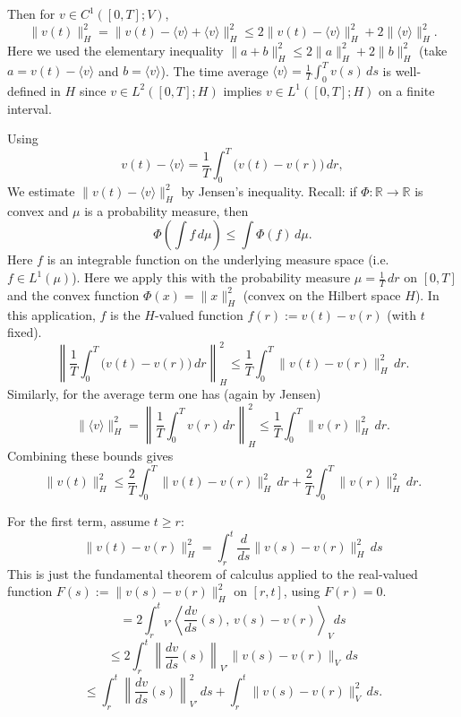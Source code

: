 \documentclass[11pt]{article}
\theoremstyle{definition}
\theoremstyle{remark}
\begin{document}
Then for $v\in C^1([0,T];V)$,
\[
\|v(t)\|_H^2
=
\|v(t)-\langle v\rangle+\langle v\rangle\|_H^2
\le
2\|v(t)-\langle v\rangle\|_H^2
+2\|\langle v\rangle\|_H^2.
\]
\noindent
Here we used the elementary inequality $\|a+b\|_H^2\le 2\|a\|_H^2+2\|b\|_H^2$ (take $a=v(t)-\langle v\rangle$ and $b=\langle v\rangle$). The time average $\langle v\rangle=\frac1T\int_0^T v(s)\,ds$ is well-defined in $H$ since $v\in L^2([0,T];H)$ implies $v\in L^1([0,T];H)$ on a finite interval.

Using
\[
v(t)-\langle v\rangle
=
\frac{1}{T}\int_0^T\bigl(v(t)-v(r)\bigr)\,dr,
\]
\noindent
We estimate $\|v(t)-\langle v\rangle\|_H^2$ by Jensen's inequality. Recall: if $\Phi:\mathbb{R}\to\mathbb{R}$ is convex and $\mu$ is a probability measure, then
\[
\Phi\!\left(\int f\,d\mu\right)\le \int \Phi(f)\,d\mu.
\]
\noindent
Here $f$ is an integrable function on the underlying measure space (i.e.\ $f\in L^1(\mu)$).
Here we apply this with the probability measure $\mu=\frac{1}{T}\,dr$ on $[0,T]$ and the convex function $\Phi(x)=\|x\|_H^2$ (convex on the Hilbert space $H$).
\noindent
In this application, $f$ is the $H$-valued function $f(r):=v(t)-v(r)$ (with $t$ fixed).
\[
\left\| \frac{1}{T}\int_0^T \bigl(v(t)-v(r)\bigr)\,dr \right\|_H^2
\le
\frac{1}{T}\int_0^T \|v(t)-v(r)\|_H^2\,dr.
\]
Similarly, for the average term one has (again by Jensen)
\[
\|\langle v\rangle\|_H^2
=
\left\|\frac{1}{T}\int_0^T v(r)\,dr\right\|_H^2
\le
\frac{1}{T}\int_0^T \|v(r)\|_H^2\,dr.
\]
Combining these bounds gives
\[
\|v(t)\|_H^2
\le
\frac{2}{T}\int_0^T \|v(t)-v(r)\|_H^2\,dr
+
\frac{2}{T}\int_0^T \|v(r)\|_H^2\,dr.
\]

For the first term, assume $t\ge r$:
\[
\|v(t)-v(r)\|_H^2
=
\int_r^t \frac{d}{ds}\|v(s)-v(r)\|_H^2\,ds
\]
\noindent
This is just the fundamental theorem of calculus applied to the real-valued function $F(s):=\|v(s)-v(r)\|_H^2$ on $[r,t]$, using $F(r)=0$.
\[
=
2\int_r^t
{}_{V'}\left\langle \frac{dv}{ds}(s),\,v(s)-v(r)\right\rangle_{V} ds
\]
\[
\le
2\int_r^t
\left\|\frac{dv}{ds}(s)\right\|_{V'}
\|v(s)-v(r)\|_V\,ds
\]
\[
\le
\int_r^t
\left\|\frac{dv}{ds}(s)\right\|_{V'}^2\,ds
+
\int_r^t
\|v(s)-v(r)\|_V^2\,ds.
\]
\end{document}
